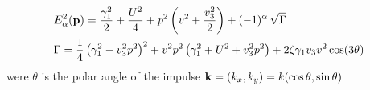 \begin{equation}
    \begin{split}
    &E_\alpha^2(\mathbf{p})=\frac{ \gamma_1^2}2 + \frac{U^2}4+
    p^2\left(
        v^2+\frac{v^2_3}2
    \right)
    +(-1)^\alpha\,\sqrt{\Gamma}
    \\
    &\Gamma=\frac 14\left( \gamma_1^2-v_3^2p^2\right)^2+
    v^2p^2\left(\gamma_1^2+U^2+v_3^2p^2 \right)+ 
    2\zeta\gamma_1v_3v^2\cos(3\theta)
    \end{split}
\end{equation}
were $\theta$ is the polar angle of the impulse $\mathbf{k}=(k_x,k_y)=k(\cos\theta,\sin\theta)$
